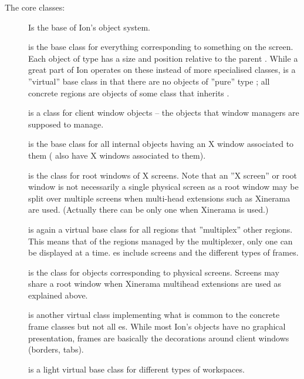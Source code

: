 The core classes:

\begin{description}
  \item[]
    Is the base of Ion's object system.
    
  \item[]
    is the base class for everything corresponding to something on the
    screen. Each object of type  has a size and  position
    relative to the parent . While a great part of Ion 
    operates on these instead of more specialised classes, 
    is a ''virtual''  base class in that there are no objects of ''pure''
    type ; all concrete regions are objects of some class 
    that inherits .

  \item[] is a class for
    client window objects -- the objects that window managers are
    supposed to manage.

  \item[] is the base class for all
    internal objects having an X window associated to them
    ( also have X windows associated to them).
    
  \item[] is the class for
    root windows of X screens.
    Note that an ''X screen'' or root window is not necessarily a
    single  physical screen as a root window
    may be split over multiple screens when multi-head extensions 
    such as Xinerama are used. (Actually there
    can be only one  when Xinerama is used.)
	
  \item[] is again a virtual base class for all regions that
    ''multiplex'' other regions. This means that of the regions managed by
    the multiplexer, only one can be displayed at a time. es 
    include screens and the different types of frames.
    
  \item[] is the class for objects
    corresponding to physical screens. Screens may share a root
    window when Xinerama multihead extensions are used as explained
    above.

  \item[] is another virtual class
    implementing what is common to the concrete frame classes but not
    all es. While most Ion's objects have no graphical 
    presentation, frames are basically the decorations around client
    windows (borders, tabs).

  \item[] is a light virtual base class
    for different types of workspaces.
\end{description}


